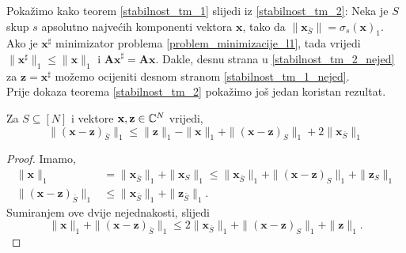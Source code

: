 \documentclass[a4paper,twoside,12pt]{memoir} %
\newcommand{\vect}[1]{\mathbf{#1}}
\renewcommand{\vec}{\vect}
\newcommand{\norm}[1]{\|{#1}\|}
\begin{document}
Poka\v{z}imo kako teorem \ref{stabilnost_tm_1} slijedi iz \ref{stabilnost_tm_2}:
Neka je $S$ skup $s$ apsolutno najve\'cih komponenti vektora $\vec x$, tako da $\norm{\vec x_{\bar S}}=\sigma_s(\vec x)_1$. Ako je $\vec x^{\sharp}$ minimizator problema \eqref{problem_minimizacije_l1}, tada vrijedi $\norm{\vec x^{\sharp}}_1 \leq \norm{\vec x}_1$ i $\vec{Ax}^{\sharp}= \vec{Ax}$. Dakle, desnu strana u \eqref{stabilnost_tm_2_nejed} za $\vec z = \vec x^{\sharp}$ mo\v{z}emo ocijeniti desnom stranom \eqref{stabilnost_tm_1_nejed}.\\
\indent
Prije dokaza teorema \ref{stabilnost_tm_2} poka\v{z}imo jo\v{s} jedan koristan rezultat.
\begin{lem}\label{stabilnost_lema_1}
    Za $S \subseteq [N]$ i vektore $\vec x, \vec z \in \C^N$ vrijedi,
    \begin{equation*}
        \norm{(\vec x - \vec z)_{\bar S}}_1 \leq \norm{\vec z}_1 - \norm{\vec x}_1 + \norm{(\vec x - \vec z)_S}_1 + 2 \norm{\vec x_{\bar S}}_1
    \end{equation*}
\end{lem}
\begin{proof}
    Imamo,
    \begin{align*}
        \norm{\vec x}_1 &= \norm{\vec x_{\bar S}}_1 + \norm{\vec{x}_S}_1 \leq \norm{\vec x_{\bar S}}_1 + \norm{(\vec x - \vec z)_S}_1 + \norm{\vec z_{S}}_1\\
        \norm{(\vec x - \vec z)_{\bar S}}_1 &\leq \norm{\vec x_{\bar S}}_1 + \norm{\vec z_{\bar S}}_1.
    \end{align*}
    Sumiranjem ove dvije nejednakosti, slijedi
    \begin{equation*}
        \norm{\vec x}_1 + \norm{(\vec x - \vec z)_{\bar S}}_1 \leq 2 \norm{\vec x_{\bar S}}_1 +  \norm{(\vec x - \vec z)_S}_1 + \norm{\vec z}_1.
    \end{equation*}
\end{proof}
\end{document}
